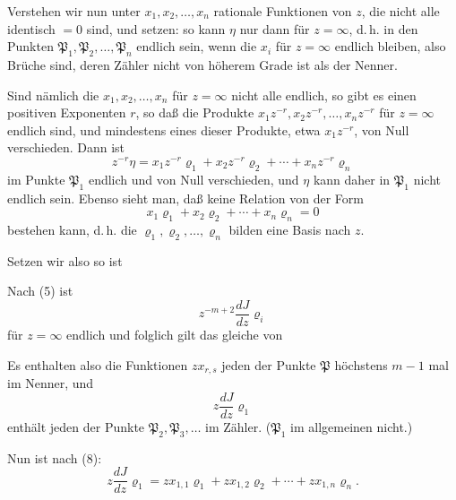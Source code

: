 Verstehen wir nun unter $x_1, x_2, \ldots, x_n$ rationale Funktionen von $z$, die nicht alle identisch $=0$ sind, und setzen:
so kann $\eta$ nur dann für $z=\infty$, d.\,h. in den Punkten $\mathfrak{P}_1, \mathfrak{P}_2, \ldots, \mathfrak{P}_n$ endlich sein, wenn die $x_i$ für $z=\infty$ endlich bleiben, also Brüche sind, deren Zähler nicht von höherem Grade ist als der Nenner.

Sind nämlich die $x_1, x_2, \ldots, x_n$ für $z=\infty$ nicht alle endlich, so gibt es einen positiven Exponenten $r$, so daß die Produkte $x_1z^{-r}, x_2z^{-r}, \ldots, x_nz^{-r}$ für $z=\infty$ endlich sind, und mindestens eines dieser Produkte, etwa $x_1z^{-r}$, von Null verschieden. Dann ist
\[
z^{-r}\eta = x_1z^{-r}\varrho_1 + x_2z^{-r}\varrho_2 + \cdots + x_nz^{-r}\varrho_n
\]
im Punkte $\mathfrak{P}_1$ endlich und von Null verschieden, und $\eta$ kann daher in $\mathfrak{P}_1$ nicht endlich sein. Ebenso sieht man, daß keine Relation von der Form
\[
x_1\varrho_1 + x_2\varrho_2 + \cdots + x_n\varrho_n = 0
\]
bestehen kann, d.\,h. die $\varrho_1, \varrho_2, \ldots, \varrho_n$ bilden eine Basis nach $z$.

Setzen wir also
so ist

Nach (5) ist
\[
z^{-m+2}\frac{dJ}{dz}\varrho_i
\]
für $z=\infty$ endlich und folglich gilt das gleiche von

Es enthalten also die Funktionen $zx_{r,s}$ jeden der Punkte $\mathfrak{P}$ höchstens $m-1$ mal im Nenner, und
\[
z\frac{dJ}{dz}\varrho_1
\]
enthält jeden der Punkte $\mathfrak{P}_2, \mathfrak{P}_3, \ldots$ im Zähler. ($\mathfrak{P}_1$ im allgemeinen nicht.)

Nun ist nach (8):
\[
z\frac{dJ}{dz}\varrho_1 = zx_{1,1}\varrho_1 + zx_{1,2}\varrho_2 + \cdots + zx_{1,n}\varrho_n.
\]
